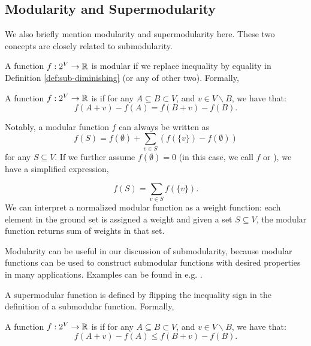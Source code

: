 \subsection{Modularity and Supermodularity}
We also briefly mention modularity and supermodularity here. These two concepts are closely related to submodularity. 

A function $f: 2^V \rightarrow \mathbb{R}$ is modular if we replace inequality by equality in Definition \ref{def:sub-diminishing} (or any of other two). Formally, 

\begin{definition}[Modularity]
  \label{def:modular}
  A function $f: 2^V \rightarrow \mathbb{R}$ is  if for any $A \subseteq B \subset V$, and $v \in V\backslash B$, we have that:
  \begin{equation}
    \label{eq:modular}
    f(A + v) - f(A) = f(B + v) - f(B).
  \end{equation}
\end{definition}
Notably, a modular function $f$ can always be written as
$$f(S) = f(\emptyset) + \sum_{v\in S} \left( f(\{v\}) - f(\emptyset) \right)$$
for any $S \subseteq V$. If we further assume $f(\emptyset) = 0$ (in this case, we call $f$  or ), we have a simplified expression,

$$f(S) = \sum_{v\in S} f(\{v\}).$$
We can interpret a normalized modular function as a weight function: each element in the ground set is assigned a weight and given a set $S \subseteq V$, the modular function returns sum of weights in that set.



Modularity can be useful in our discussion of submodularity, because modular functions can be used to construct submodular functions with desired properties in many applications. Examples can be found in e.g. \cite{LB11,LB11word}.




A supermodular function is defined by flipping the inequality sign in the definition of a submodular function. Formally,
\begin{definition}[Supermodularity]
  \label{def:supermodular}
  A function $f: 2^V \rightarrow \mathbb{R}$ is  if for any $A \subseteq B \subset V$, and $v \in V\backslash B$, we have that:
  \begin{equation}
    \label{eq:submodular}
    f(A + v) - f(A) \leq f(B + v) - f(B).
  \end{equation}
\end{definition}

